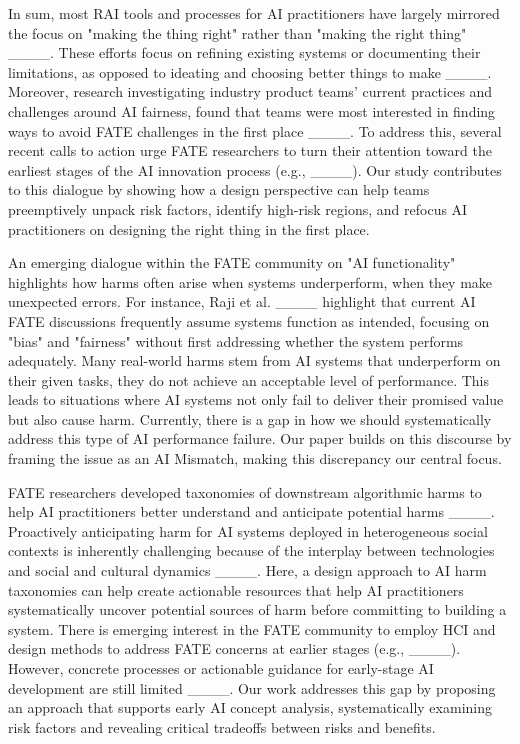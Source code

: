 In sum, most RAI tools and processes for AI practitioners have largely mirrored the focus on "making the thing right" rather than "making the right thing" ____. These efforts focus on refining existing systems or documenting their limitations, as opposed to ideating and choosing better things to make ____. Moreover, research investigating industry product teams' current practices and challenges around AI fairness, found that teams were most interested in finding ways to avoid FATE challenges in the first place ____. To address this, several recent calls to action urge FATE researchers to turn their attention toward the earliest stages of the AI innovation process (e.g., ____). Our study contributes to this dialogue by showing how a design perspective can help teams preemptively unpack risk factors, identify high-risk regions, and refocus AI practitioners on designing the right thing in the first place.

An emerging dialogue within the FATE community on "AI functionality" highlights how harms often arise when systems underperform, when they make unexpected errors. For instance, Raji et al. ____ 
highlight that current AI FATE discussions frequently assume systems function as intended, focusing on "bias" and "fairness" without first addressing whether the system performs adequately.
Many real-world harms stem from AI systems that underperform on their given tasks, they do not achieve an acceptable level of performance. This leads to situations where AI systems not only fail to deliver their promised value but also cause harm. Currently, there is a gap in how we should systematically address this type of AI performance failure. Our paper builds on this discourse by framing the issue as an AI Mismatch, making this discrepancy our central focus.

FATE researchers developed taxonomies of downstream algorithmic harms to help AI practitioners better understand and anticipate potential harms ____. Proactively anticipating harm for AI systems deployed in heterogeneous social contexts is inherently challenging because of the interplay between technologies and social and cultural dynamics ____. Here, a design approach to AI harm taxonomies can help create actionable resources that help AI practitioners systematically uncover potential sources of harm before committing to building a system. There is emerging interest in the FATE community to employ HCI and design methods to address FATE concerns at earlier stages (e.g., ____). 
However, concrete processes or actionable guidance for early-stage AI development are still limited ____. 
Our work addresses this gap by proposing an approach that supports early AI concept analysis, systematically examining risk factors and revealing critical tradeoffs between risks and benefits.

